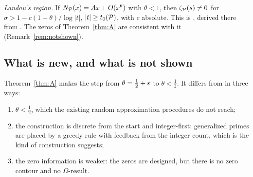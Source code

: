 \emph{Landau's region.} If $N_{\mathcal{P}}(x)=Ax+O(x^{\theta})$ with $\theta<1$, then $\zeta_{\mathcal{P}}(s)\ne0$ for
$\sigma>1-c(1-\theta)/\log|t|$, $|t|\ge t_0(\mathcal{P})$, with $c$ absolute. This is \cite[(1.2)]{Broucke2025}, derived there from
\cite[Thm.~6.1, (1.4)]{Broucke2025}. The zeros of Theorem~\ref{thm:A} are consistent with it (Remark~\ref{rem:notshown}).

\subsection{What is new, and what is not shown}
Theorem~\ref{thm:A} makes the step from $\theta=\tfrac12+\varepsilon$ to $\theta<\tfrac12$. It differs from \cite[Thm.~1.6]{Broucke2025}
in three ways:
\begin{enumerate}[label=(\alph*)]
\item $\theta<\tfrac12$, which the existing random approximation procedures \cite{DMV2006,Zhang2007,BrouckeVindas2024,BDR} do
not reach;
\item the construction is discrete from the start and integer-first: generalized primes are placed by a greedy rule with
feedback from the integer count, which is the kind of construction \cite[\S5]{BDR} suggests;
\item the zero information is weaker: the zeros are designed, but there is no zero contour and no $\Omega$-result.
\end{enumerate}

